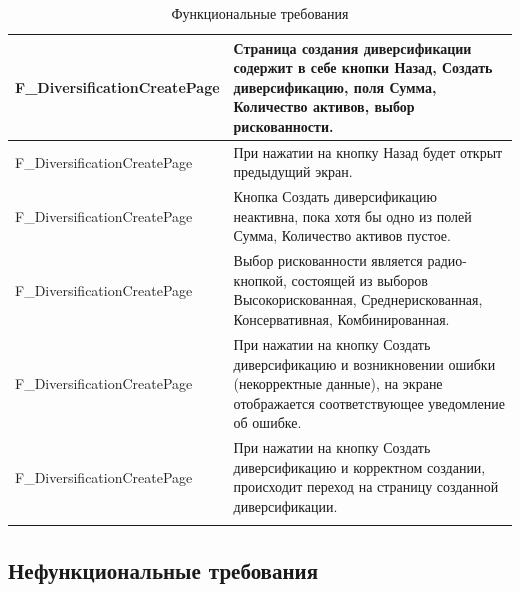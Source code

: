 \documentclass[a4paper, 14pt]{article}
\begin{document}
\begin{longtable}{| p{} | p{} |}
    F\_DiversificationCreatePage & Страница создания диверсификации содержит в себе кнопки Назад, Создать диверсификацию, поля Сумма, Количество активов, выбор рискованности.                         \\ \hline
    F\_DiversificationCreatePage & При нажатии на кнопку Назад будет открыт предыдущий экран.                                                                                                          \\ \hline
    F\_DiversificationCreatePage & Кнопка Создать диверсификацию неактивна, пока хотя бы одно из полей Сумма, Количество активов пустое.                                                               \\ \hline
    F\_DiversificationCreatePage & Выбор рискованности является радио-кнопкой, состоящей из выборов Высокорискованная, Среднерискованная, Консервативная, Комбинированная.                             \\ \hline
    F\_DiversificationCreatePage & При нажатии на кнопку Создать диверсификацию и возникновении ошибки (некорректные данные), на экране отображается соответствующее уведомление об ошибке.            \\ \hline
    F\_DiversificationCreatePage & При нажатии на кнопку Создать диверсификацию и корректном создании, происходит переход на страницу созданной диверсификации.                                        \\ \hline
    \caption{Функциональные требования}
\end{longtable}

\subsection{Нефункциональные требования}
\end{document}
